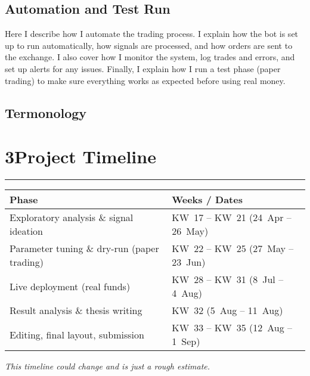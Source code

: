 \documentclass[12pt,a4paper]{article}
\begin{document}
\subsection{Automation and Test Run}
Here I describe how I automate the trading process. I explain how the bot
is set up to run automatically, how signals are processed, and how orders
are sent to the exchange. I also cover how I monitor the system, log trades
and errors, and set up alerts for any issues. Finally, I explain how I run a
test phase (paper trading) to make sure everything works as expected before
using real money.

\subsection{Termonology}

\section*{3\hspace{1em}Project Timeline}
\vspace{-0.5em}
\noindent\rule{\textwidth}{0.5pt}

\begin{tabular}{|>{\raggedright\arraybackslash}p{7cm}|>{\raggedright\arraybackslash}p{7cm}|}
\hline
\textbf{Phase} & \textbf{Weeks / Dates}\\ \hline
Exploratory analysis \& signal ideation & KW~17 -- KW~21 (24~Apr -- 26~May)\\ \hline
Parameter tuning \& dry-run (paper trading) & KW~22 -- KW~25 (27~May -- 23~Jun)\\ \hline
Live deployment (real funds) & KW~28 -- KW~31 (8~Jul -- 4~Aug)\\ \hline
Result analysis \& thesis writing & KW~32 (5~Aug -- 11~Aug)\\ \hline
Editing, final layout, submission & KW~33 -- KW~35 (12~Aug -- 1~Sep)\\ \hline
\end{tabular}

\vspace{0.5em}

\begin{tcolorbox}[colback=blue!10!white, colframe=blue!10!white, boxrule=0pt, arc=0pt, left=0pt, right=0pt, top=0pt, bottom=0pt]
\textit{This timeline could change and is just a rough estimate.}
\end{tcolorbox}
\end{document}
